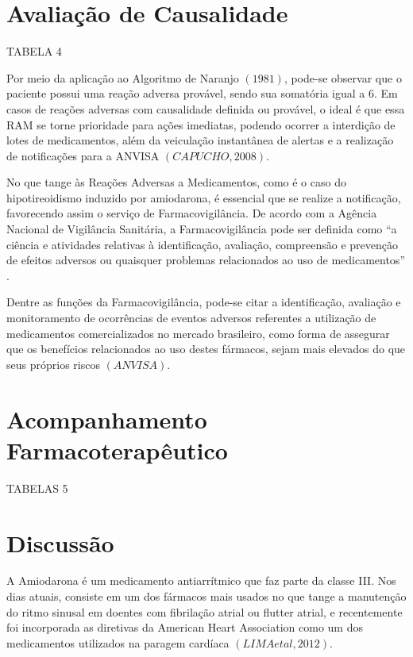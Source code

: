 \documentclass[svgnames,12pt,oneside, openright,a4paper]{scrbook}
\begin{document}
\chapter{Avaliação de Causalidade}

TABELA 4

Por meio da aplicação ao Algoritmo de Naranjo $(1981)$, pode-se observar que o paciente possui uma reação adversa provável, sendo sua somatória igual a 6. Em casos de reações adversas com causalidade definida ou provável, o ideal é que essa RAM se torne prioridade para ações imediatas, podendo ocorrer a interdição de lotes de medicamentos, além da veiculação instantânea de alertas e a realização de notificações para a ANVISA $(CAPUCHO, 2008)$. 

No que tange às Reações Adversas a Medicamentos, como é o caso do hipotireoidismo induzido por amiodarona, é essencial que se realize a notificação, favorecendo assim o serviço de Farmacovigilância. De acordo com a Agência Nacional de Vigilância Sanitária, a Farmacovigilância pode ser definida como $“$a ciência e atividades relativas à identificação, avaliação, compreensão e prevenção de efeitos adversos ou quaisquer problemas relacionados ao uso de medicamentos$”$.

Dentre as funções da Farmacovigilância, pode-se citar a identificação, avaliação e monitoramento de ocorrências de eventos adversos referentes a utilização de medicamentos comercializados no mercado brasileiro, como forma de assegurar que os benefícios relacionados ao uso destes fármacos, sejam mais elevados do que seus próprios riscos $(ANVISA)$. 

\chapter{Acompanhamento Farmacoterapêutico}

TABELAS 5

\chapter{Discussão}

A Amiodarona é um medicamento antiarrítmico que faz parte da classe III. Nos dias atuais, consiste em um dos fármacos mais usados no que tange a manutenção do ritmo sinusal em doentes com fibrilação atrial ou flutter atrial, e recentemente foi incorporada as diretivas da American Heart Association como um dos medicamentos utilizados na paragem cardíaca $(LIMA et al, 2012)$. 
\end{document}
